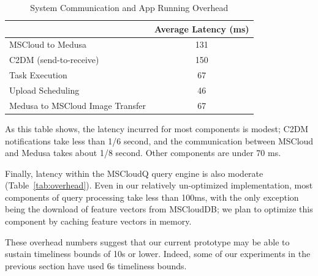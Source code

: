 %


\begin{table}
  \footnotesize
    \centering
    \begin{tabular}{ lc}
    \toprule
    & Average Latency (ms) \\
    \midrule
    MSCloud to Medusa & 131 \\
    C2DM (send-to-receive) & 150 \\
    Task Execution & 67 \\
    Upload Scheduling & 46 \\
    Medusa to MSCloud Image Transfer & 67 \\
    \bottomrule
    \end{tabular}
    \caption{System Communication and App Running Overhead}
    \label{tab:factor}
\end{table}
%
As this table shows, the latency incurred for most components is
modest; C2DM notifications take less than 1/6 second, and the
communication between MSCloud and Medusa takes about 1/8 second.
%
Other components are under 70 ms.
%

Finally, latency within the MSCloudQ query engine is also moderate
(Table~\ref{tab:overhead}).
%
Even in our relatively un-optimized implementation, most components of
query processing take less than 100ms, with the only exception being
the download of feature vectors from MSCloudDB; we plan to optimize
this component by caching feature vectors in memory.

These overhead numbers suggest that our current prototype
may be able to sustain timeliness bounds of 10s or lower.
%
Indeed, some of our experiments in the previous section have used 6s
timeliness bounds.

